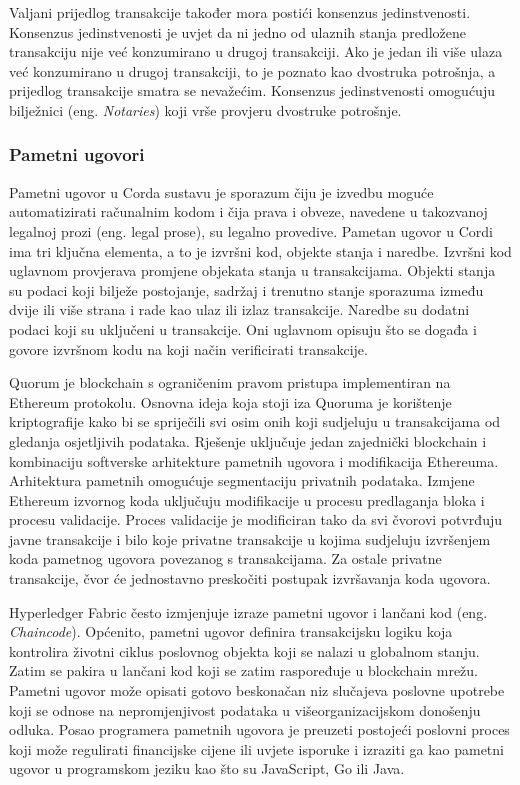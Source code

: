 \documentclass[times, utf8, diplomski]{fer}
\begin{document}
Valjani prijedlog transakcije također mora postići konsenzus jedinstvenosti. Konsenzus jedinstvenosti je uvjet da ni jedno od ulaznih stanja predložene transakciju nije već konzumirano u drugoj transakciji. Ako je jedan ili više ulaza već konzumirano u drugoj transakciji, to je poznato kao dvostruka potrošnja, a prijedlog transakcije smatra se nevažećim. Konsenzus jedinstvenosti omogućuju bilježnici (eng. \textit{Notaries}) koji vrše provjeru dvostruke potrošnje.

\subsubsection{Pametni ugovori}
Pametni ugovor u Corda sustavu je sporazum čiju je izvedbu moguće automatizirati računalnim kodom i čija prava i obveze, navedene u takozvanoj legalnoj prozi (eng. legal prose), su legalno provedive. Pametan ugovor u Cordi ima tri ključna elementa, a to je izvršni kod, objekte stanja i naredbe. Izvršni kod uglavnom provjerava promjene objekata stanja u transakcijama. Objekti stanja su podaci koji bilježe postojanje, sadržaj i trenutno stanje sporazuma između dvije ili više strana i rade kao ulaz ili izlaz transakcije. Naredbe su dodatni podaci koji su uključeni u transakcije. Oni uglavnom opisuju što se događa i govore izvršnom kodu na koji način verificirati transakcije.  \cite{smartcontract} 

Quorum je blockchain s ograničenim pravom pristupa implementiran na Ethereum protokolu. Osnovna ideja koja stoji iza Quoruma je korištenje kriptografije kako bi se spriječili svi osim onih koji sudjeluju u transakcijama od gledanja osjetljivih podataka. Rješenje uključuje jedan zajednički blockchain i kombinaciju softverske arhitekture pametnih ugovora i modifikacija Ethereuma. Arhitektura pametnih omogućuje segmentaciju privatnih podataka. Izmjene Ethereum izvornog koda uključuju modifikacije u procesu predlaganja bloka i procesu validacije. Proces validacije je modificiran tako da svi čvorovi potvrđuju javne transakcije i bilo koje privatne transakcije u kojima sudjeluju izvršenjem koda pametnog ugovora povezanog s transakcijama. Za ostale privatne transakcije, čvor će jednostavno preskočiti postupak izvršavanja koda ugovora. \cite{Quorum}

Hyperledger Fabric često izmjenjuje izraze pametni ugovor i lančani kod (eng. \textit{Chaincode}). Općenito, pametni ugovor definira transakcijsku logiku koja kontrolira životni ciklus poslovnog objekta koji se nalazi u globalnom stanju. Zatim se pakira u lančani kod koji se zatim raspoređuje u blockchain mrežu. Pametni ugovor može opisati gotovo beskonačan niz slučajeva poslovne upotrebe koji se odnose na nepromjenjivost podataka u višeorganizacijskom donošenju odluka. Posao programera pametnih ugovora je preuzeti postojeći poslovni proces koji može regulirati financijske cijene ili uvjete isporuke i izraziti ga kao pametni ugovor u programskom jeziku kao što su JavaScript, Go ili Java. \cite{Fabric}
\end{document}
